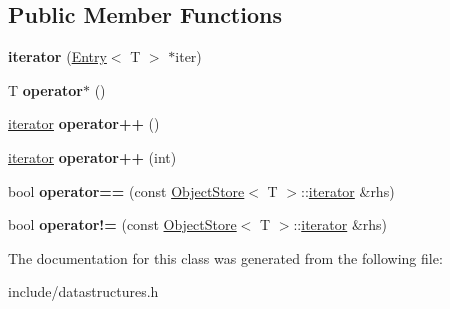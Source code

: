 \subsection*{Public Member Functions}
\begin{DoxyCompactItemize}
\item 
\hypertarget{classmlnet_1_1_object_store_1_1iterator_ae4d977f310451507687b025a3e97f842}{{\bfseries iterator} (\hyperlink{structmlnet_1_1_entry}{Entry}$<$ T $>$ $\ast$iter)}\label{classmlnet_1_1_object_store_1_1iterator_ae4d977f310451507687b025a3e97f842}

\item 
\hypertarget{classmlnet_1_1_object_store_1_1iterator_ace260913a2248b4bbe6ed12723346495}{T {\bfseries operator$\ast$} ()}\label{classmlnet_1_1_object_store_1_1iterator_ace260913a2248b4bbe6ed12723346495}

\item 
\hypertarget{classmlnet_1_1_object_store_1_1iterator_a7151181bcad122d9cf7f84d2f8b501e3}{\hyperlink{classmlnet_1_1_object_store_1_1iterator}{iterator} {\bfseries operator++} ()}\label{classmlnet_1_1_object_store_1_1iterator_a7151181bcad122d9cf7f84d2f8b501e3}

\item 
\hypertarget{classmlnet_1_1_object_store_1_1iterator_ac8033bdb4c889b4362d876ef1ae44d3d}{\hyperlink{classmlnet_1_1_object_store_1_1iterator}{iterator} {\bfseries operator++} (int)}\label{classmlnet_1_1_object_store_1_1iterator_ac8033bdb4c889b4362d876ef1ae44d3d}

\item 
\hypertarget{classmlnet_1_1_object_store_1_1iterator_a12a6d6c6fb88a16d2ba7262a4e2b1ecb}{bool {\bfseries operator==} (const \hyperlink{structmlnet_1_1_object_store}{Object\+Store}$<$ T $>$\+::\hyperlink{classmlnet_1_1_object_store_1_1iterator}{iterator} \&rhs)}\label{classmlnet_1_1_object_store_1_1iterator_a12a6d6c6fb88a16d2ba7262a4e2b1ecb}

\item 
\hypertarget{classmlnet_1_1_object_store_1_1iterator_af16e594c71a426e7d28a3bef75c211b8}{bool {\bfseries operator!=} (const \hyperlink{structmlnet_1_1_object_store}{Object\+Store}$<$ T $>$\+::\hyperlink{classmlnet_1_1_object_store_1_1iterator}{iterator} \&rhs)}\label{classmlnet_1_1_object_store_1_1iterator_af16e594c71a426e7d28a3bef75c211b8}

\end{DoxyCompactItemize}


The documentation for this class was generated from the following file\+:\begin{DoxyCompactItemize}
\item 
include/datastructures.\+h\end{DoxyCompactItemize}
